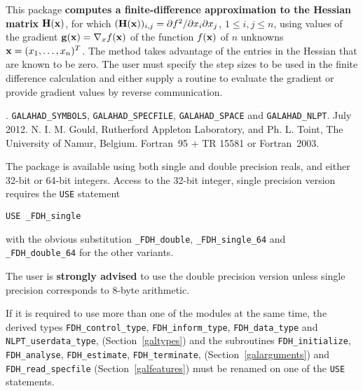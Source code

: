 \documentclass{galahad}
\newcommand{\packagename}{FDH}
\newcommand{\fullpackagename}{\libraryname\_\packagename}
\begin{document}
\galheader


\galsummary
This package 
{\bf computes a finite-difference approximation to the Hessian matrix} 
${\mathbf{H}}({\mathbf{x}})$, for which  
$({\mathbf{H}}({\mathbf{x}}))_{i,j} = \partial f^2 / \partial x_i \partial x_j$,
$1 \leq i, j \leq n$,  
using values of the gradient ${\mathbf{g}}({\mathbf{x}}) = \nabla_x f({\mathbf{x}})$ 
of the function $f({\mathbf{x}})$ of $n$ unknowns ${\mathbf{x}} = (x_1, \ldots, x_n)^T$. 
The method takes advantage of the entries in the Hessian that are known to
be zero.  The user must specify the step sizes to be used in the
finite difference calculation and either supply a routine to evaluate
the gradient or provide gradient values by reverse communication.


\galattributes
\galversions{\tt  \fullpackagename\_single, \fullpackagename\_double}.
\galuses 
{\tt GALAHAD\_SY\-M\-BOLS}, 
{\tt GALAHAD\_SP\-ECFILE},
{\tt GALAHAD\_SPACE} and
{\tt GALAHAD\_NLPT}.
\galdate July 2012.
\galorigin N. I. M. Gould, Rutherford Appleton Laboratory,
and Ph. L. Toint, The University of Namur, Belgium.
\gallanguage Fortran~95 + TR 15581 or Fortran~2003. 


\galhowto

The package is available using both single and double precision reals, 
and either 32-bit or 64-bit integers. Access to the 32-bit integer,
single precision version requires the {\tt USE} statement
\medskip

\hspace{8mm} {\tt USE \fullpackagename\_single}

\medskip
\noindent
with the obvious substitution {\tt \fullpackagename\_double},
{\tt \fullpackagename\_single\_64} and 
{\tt \fullpackagename\_double\_64} for the other variants.

The user is {\bf strongly advised} to use the double
precision version unless single precision corresponds to 8-byte arithmetic.

\noindent
If it is required to use more than one of the modules at the same time, 
the derived types
{\tt \packagename\_control\_type}, 
{\tt \packagename\_inform\_type},
{\tt \packagename\_data\_type}
and
{\tt NLPT\_userdata\_type},
(Section~\ref{galtypes})
and the subroutines
{\tt \packagename\_initialize}, 
{\tt \packagename\_\-analyse},
{\tt \packagename\_\-estimate},
{\tt \packagename\_terminate},
(Section~\ref{galarguments})
and 
{\tt \packagename\_read\_specfile}
(Section~\ref{galfeatures})
must be renamed on one of the {\tt USE} statements.
\end{document}
